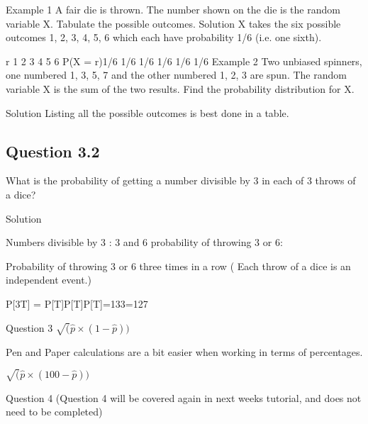 {%
Example 1
A fair die is thrown. The number shown on the die is the random variable X. Tabulate the possible outcomes.
Solution
X takes the six possible outcomes 1, 2, 3, 4, 5, 6 which each have probability 1/6 (i.e. one sixth).

r 1 2 3 4 5 6
P(X = r)1/6 1/6 1/6 1/6 1/6 1/6
Example 2
Two unbiased spinners, one numbered 1, 3, 5, 7 and the other numbered 1, 2, 3 are spun. The random variable X is the sum of the two results.
Find the probability distribution for X.



Solution
Listing all the possible outcomes is best done in a table.







\subsection{Question 3.2 }


What is the probability of getting a number divisible by 3 in each of 3 throws of a dice?




Solution



Numbers divisible by 3 : 3 and 6            probability of throwing 3 or 6:   



Probability of throwing 3 or 6 three times in a row  ( Each throw of a dice is an independent event.)



P[3T] = P[T]P[T]P[T]=133=127




Question 3
$\sqrt(\hat{p} \times (1-\hat{p} ))$

Pen and Paper calculations are a bit easier when working in terms of percentages.

$\sqrt(\hat{p} \times (100-\hat{p} ))$

Question 4
(Question 4 will be covered again in next weeks tutorial, and does not need to be completed)



}
